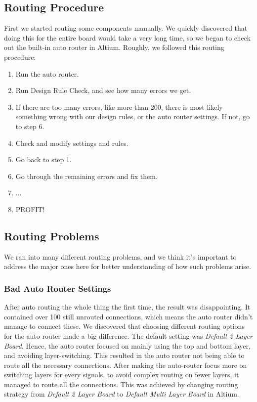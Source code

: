 \begin{itemize}
\subsection{Routing Procedure}
First we started routing some components manually. We quickly discovered that doing this for the entire board would take a very long time, so we began to check out the built-in auto router in Altium. 
\newline
\newline
Roughly, we followed this routing procedure:
\begin{enumerate}
\item Run the auto router.
\item Run Design Rule Check, and see how many errors we get. 
\item If there are too many errors, like more than 200, there is most likely something wrong with our design rules, or the auto router settings. If not, go to step 6.
\item Check and modify settings and rules.
\item Go back to step 1.
\item Go through the remaining errors and fix them. 
\item ...
\item PROFIT!
\end{enumerate}
\subsection{Routing Problems}
We ran into many different routing problems, and we think it's important to address the major ones here for better understanding of how such problems arise.

\subsubsection{Bad Auto Router Settings}
After auto routing the whole thing the first time, the result was disappointing. It contained over 100 still unrouted connections, which means the auto router didn't manage to connect these.
\newline
\newline
We discovered that choosing different routing options for the auto router made a big difference. The default setting was \emph{Default 2 Layer Board}. Hence, the auto router focused on mainly using the top and bottom layer, and avoiding layer-switching. This resulted in the auto router not being able to route all the necessary connections.
\newline
\newline
After making the auto-router focus more on switching layers for every signals, to avoid complex routing on fewer layers, it managed to route all the connections. This was achieved by changing routing strategy from \emph{Default 2 Layer Board} to \emph{Default Multi Layer Board} in Altium.


\end{itemize}
